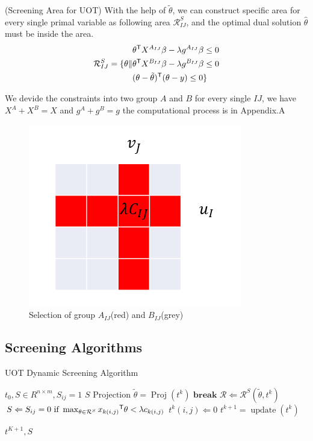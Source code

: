 \begin{thm}\label{area}(Screening Area for UOT) With the help of $\tilde{\theta}$, we can construct specific area for every single primal variable as following area $\mathcal{R}^{S}_{IJ}$, and the optimal dual solution $\hat{\theta}$ must be inside the area.
 \begin{equation}
\begin{split} 
\mathcal{R}^S_{IJ} = \{ \theta \|
\begin{aligned}
 &\theta^{\mathsf T}X^{A_{IJ}}\beta - \lambda g^{A_{IJ}}\beta\leq 0 \\
  &\theta^{\mathsf T}X^{B_{IJ}}\beta - \lambda g^{B_{IJ}}\beta \leq 0\\
   &(\theta-\tilde{\theta})^{\mathsf T}(\theta-y)\leq 0\}
\end{aligned}
\end{split}
\label{eq:divide}
\end{equation}
\end{thm}
We devide the constraints into two group $A$ and $B$ for every single $IJ$, we have $X^A +X^B=X$ and $g^A+g^B = g$
the computational process is in Appendix.A
	\begin{figure}[htbp]
	\begin{center}	
	\includegraphics[width=0.4\hsize]{pic/divide}
	\caption{Selection of group $A_{IJ}$(red) and $B_{IJ}$(grey)}
	\end{center}	
	\end{figure}

\subsection{Screening Algorithms}

 \begin{algorithm}
 \caption{UOT Dynamic Screening Algorithm}
 \begin{algorithmic}[1]
 \renewcommand{\algorithmicrequire}{\textbf{Input:}}
 \renewcommand{\algorithmicensure}{\textbf{Output:}}
 \REQUIRE $t_0, S \in R^{n\times m}, S_{ij}=1$
 \ENSURE  $S$
  \STATE {}
  \STATE $\text{Projection } \tilde{\theta} = \operatorname{Proj}(t^k)$ 
  \STATE $\textbf{break}$
  \ENDIF
    \STATE $\mathcal{R} \Leftarrow \mathcal{R}^S{(\tilde{\theta},t^k)}$
    \STATE $S \Leftarrow {S_{ij} = 0 \text{ if } \max_{\theta \in \mathcal{R}^S} {x_{k(i,j)}}^{\mathsf T}\theta <\lambda c_{k(i,j)} }$
    \STATE $t^k(i,j) \Leftarrow 0$
    \ENDFOR
    \STATE $t^{k+1} = \operatorname{update}(t^k)$
  \ENDFOR
  
 \RETURN $t^{K+1}, S $ 
 \end{algorithmic} 
 \end{algorithm}

